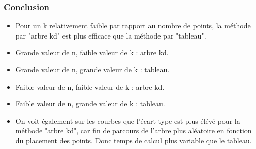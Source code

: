 \documentclass{beamer}
\begin{document}
\begin{frame}
\frametitle{Conclusion}
\begin{itemize}
    \setlength\itemsep{1em}
    \item[{\color{blue}\textbullet}] Pour un k relativement faible par rapport au nombre de points, la méthode par "arbre kd" est plus efficace que la méthode par "tableau". 
    \item[{\color{blue}\textbullet}]Grande valeur de n, faible valeur de k : arbre kd.
    \item[{\color{blue}\textbullet}]Grande valeur de n, grande valeur de k : tableau.
    \item[{\color{blue}\textbullet}]Faible valeur de n, faible valeur de k : arbre kd.
    \item[{\color{blue}\textbullet}]Faible valeur de n, grande valeur de k : tableau.
    \item[{\color{blue}\textbullet}]On voit également sur les courbes que l'écart-type est plus élévé pour la méthode "arbre kd", car fin de parcours de l'arbre plus aléatoire en fonction du placement des points. Donc temps de calcul plus variable que le tableau.
\end{itemize}
\end{frame}
\end{document}
